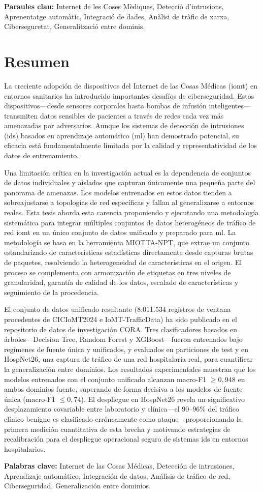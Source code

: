 \bigskip
\textbf{Paraules clau:} Internet de les Coses Mèdiques, Detecció d'intrusions, Aprenentatge automàtic, Integració de dades, Anàlisi de tràfic de xarxa, Ciberseguretat, Generalització entre dominis.

\cleardoublepage

\chapter*{Resumen}

La creciente adopción de dispositivos del Internet de las Cosas Médicas (\gls{iomt}) en entornos sanitarios ha introducido importantes desafíos de ciberseguridad. Estos dispositivos---desde sensores corporales hasta bombas de infusión inteligentes---transmiten datos sensibles de pacientes a través de redes cada vez más amenazadas por adversarios. Aunque los sistemas de detección de intrusiones (\gls{ids}) basados en aprendizaje automático (\gls{ml}) han demostrado potencial, su eficacia está fundamentalmente limitada por la calidad y representatividad de los datos de entrenamiento.

Una limitación crítica en la investigación actual es la dependencia de conjuntos de datos individuales y aislados que capturan únicamente una pequeña parte del panorama de amenazas. Los modelos entrenados en estos datos tienden a sobreajustarse a topologías de red específicas y fallan al generalizarse a entornos reales. Esta tesis aborda esta carencia proponiendo y ejecutando una metodología sistemática para integrar múltiples conjuntos de datos heterogéneos de tráfico de red \gls{iomt} en un único conjunto de datos unificado y preparado para \gls{ml}. La metodología se basa en la herramienta MIOTTA-NPT, que extrae un conjunto estandarizado de características estadísticas directamente desde capturas brutas de paquetes, resolviendo la heterogeneidad de características en el origen. El proceso se complementa con armonización de etiquetas en tres niveles de granularidad, garantía de calidad de los datos, escalado de características y seguimiento de la procedencia.

El conjunto de datos unificado resultante (8.011.534 registros de ventana procedentes de CICIoMT2024 e IoMT-TrafficData) ha sido publicado en el repositorio de datos de investigación CORA. Tres clasificadores basados en árboles---Decision Tree, Random Forest y XGBoost---fueron entrenados bajo regímenes de fuente única y unificados, y evaluados en particiones de test y en HospNet26, una captura de tráfico de una red hospitalaria real, para cuantificar la generalización entre dominios. Los resultados experimentales muestran que los modelos entrenados con el conjunto unificado alcanzan macro-F1 $\geq 0{,}948$ en ambos dominios fuente, superando de forma decisiva a los modelos de fuente única (macro-F1 $\leq 0{,}74$). El despliegue en HospNet26 revela un significativo desplazamiento covariable entre laboratorio y clínica---el $90$--$96\%$ del tráfico clínico benigno es clasificado erróneamente como ataque---proporcionando la primera medición cuantitativa de esta brecha y motivando estrategias de recalibración para el despliegue operacional seguro de sistemas \gls{ids} en entornos hospitalarios.

\bigskip
\textbf{Palabras clave:} Internet de las Cosas Médicas, Detección de intrusiones, Aprendizaje automático, Integración de datos, Análisis de tráfico de red, Ciberseguridad, Generalización entre dominios.
